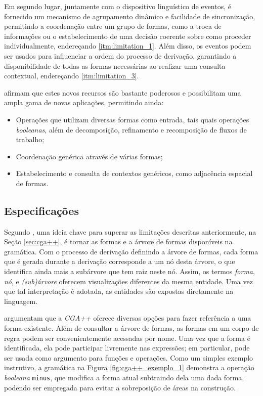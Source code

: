 Em segundo lugar, juntamente com o dispositivo linguístico de eventos, é fornecido um mecanismo de agrupamento dinâmico e facilidade de sincronização, permitindo a coordenação entre um grupo de formas, como a troca de informações ou o estabelecimento de uma decisão coerente sobre como proceder individualmente, endereçando \ref{itm:limitation_1}. Além disso, os eventos podem ser usados para influenciar a ordem do processo de derivação, garantindo a disponibilidade de todas as formas necessárias ao realizar uma consulta contextual, endereçando \ref{itm:limitation_3}.

 afirmam que estes novos recursos são bastante poderosos e possibilitam uma ampla gama de novas aplicações, permitindo ainda:

\begin{itemize}
    \item Operações que utilizam diversas formas como entrada, tais quais operações \textit{booleanas}, além de decomposição, refinamento e recomposição de fluxos de trabalho;

    \item Coordenação genérica através de várias formas;

    \item Estabelecimento e consulta de contextos genéricos, como adjacência espacial de formas.
\end{itemize}

\subsection{Especificações}
\label{sec:especificacoes}

Segundo , uma ideia chave para superar as limitações descritas anteriormente, na Seção \ref{sec:cga++}, é tornar as formas e a árvore de formas disponíveis na gramática. Com o processo de derivação definindo a árvore de formas, cada forma que é gerada durante a derivação corresponde a um nó desta árvore, o que identifica ainda mais a subárvore que tem raiz neste nó. Assim, os termos \textit{forma}, \textit{nó}, e \textit{(sub)árvore} oferecem visualizações diferentes da mesma entidade. Uma vez que tal interpretação é adotada, as entidades são expostas diretamente na linguagem.

 argumentam que a \textit{CGA++} oferece diversas opções para fazer referência a uma forma existente. Além de consultar a árvore de formas, as formas em um corpo de regra podem ser convenientemente acessadas por nome. Uma vez que a forma é identificada, ela pode participar livremente nas expressões; em particular, pode ser usada como argumento para funções e operações. Como um simples exemplo instrutivo, a gramática na Figura \ref{fig:cga++_exemplo_1} demonstra a operação \textit{booleana} \texttt{minus}, que modifica a forma atual subtraindo dela uma dada forma, podendo ser empregada para evitar a sobreposição de áreas na construção.

